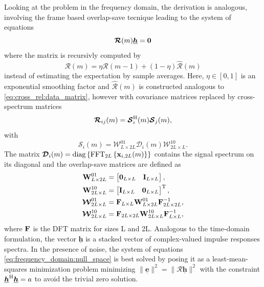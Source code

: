 \documentclass{article}
\newcommand{\x}{\mtxb{x}}
\newcommand{\hf}{\underline{\bm{h}}}
\newcommand{\Rf}{\bm{\mathcal{R}}}
\begin{document}
Looking at the problem in the frequency domain, the derivation is analogous, involving the frame based overlap-save tecnique leading to the system of equations 
\begin{equation}
    \Rf(m) \hf = \bm{0} \label{eq:frequency_domain:null_space}\\
\end{equation}
where the matrix is recursivly computed by \begin{equation}
    \Rf(m) = \eta \Rf(m-1) + (1-\eta )\hat{\Rf}(m)
\end{equation}
instead of estimating the expectation by sample averages. Here, \(\eta \in [0,1]\) is an exponential smoothing factor and \(\hat{\Rf}(m)\) is constructed analogous to \eqref{eq:cross_rel:data_matrix}, however with covariance matrices replaced by cross-spectrum matrices 
\begin{equation}
    \Rf_{ij}(m) = \bm{\mathcal{S}}_{i}^\herm (m) \bm{\mathcal{S}}_{j}(m),
\end{equation}
with 
\begin{equation}
    \bm{\mathcal{S}}_{i}(m) = \bm{\mathcal{W}}^{01}_{L \times 2L} \bm{\mathcal{D}}_{i}(m) \bm{\mathcal{W}}^{10}_{2L \times L}.
\end{equation}
The matrix \(\bm{\mathcal{D}}_{i}(m) = \operatorname{diag} \left\{ \operatorname{FFT}_{2L} \left\{ \x_{i,2L}(m) \right\} \right\}\) contains the  signal spectrum on its diagonal and the overlap-save matrices are defined as
\begin{align}
    \bm{\mathrm{W}}_{L \times 2L}^{01} &= \begin{bmatrix}
        \bm{\mathrm{0}}_{L \times L} & \bm{\mathrm{I}}_{L \times L}
    \end{bmatrix},\\
    \bm{\mathrm{W}}_{2L \times L}^{10} &= \begin{bmatrix}
        \bm{\mathrm{I}}_{L \times L} & \bm{\mathrm{0}}_{L \times L}
    \end{bmatrix}^{\mathrm{T}},\\
    \bm{\mathcal{W}}_{2L \times L}^{01} &= \bm{\mathrm{F}}_{L \times L} \bm{\mathrm{W}}_{L \times 2L}^{01} \bm{\mathrm{F}}_{2L \times 2L}^{-1},\\
    \bm{\mathcal{W}}_{2L \times L}^{10} &= \bm{\mathrm{F}}_{2L \times 2L} \bm{\mathrm{W}}_{2L \times L}^{10} \bm{\mathrm{F}}_{L \times L}^{-1},
\end{align} where $\bm{\mathrm{F}}$ is the DFT matrix for sizes L and 2L.
Analogous to the time-domain formulation, the vector \(\hf\) is a stacked vector of complex-valued impulse responses spectra.
In the presence of noise, the system of equations \eqref{eq:frequency_domain:null_space} is best solved by posing it as a least-mean-squares minimization problem minimizing \(\|\underline{\bm{e}} \|^2 = \| \Rf \hf \|^2\) with the constraint \(\hf^\herm \hf = a\) to avoid the trivial zero solution.
\end{document}
